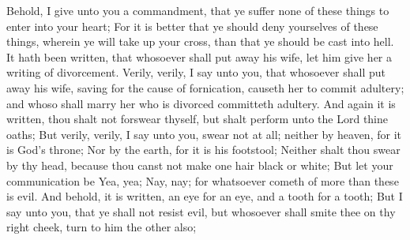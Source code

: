 Behold, I give unto you a commandment, that ye suffer none of these things to enter into your heart;
\bverse \iffalse For it is better that ye should deny yourselves of these things, wherein ye will take up your cross, than that ye should be cast into hell. \fi
For it is better that ye should deny yourselves of these things, wherein ye will take up your cross, than that ye should be cast into hell.
\bverse \iffalse It hath been written, that whosoever shall put away his wife, let him give her a writing of divorcement. \fi
It hath been written, that whosoever shall put away his wife, let him give her a writing of divorcement.
\bverse \iffalse Verily, verily, I say unto you, that whosoever shall put away his wife, saving for the cause of fornication, causeth her to commit adultery; and whoso shall marry her who is divorced committeth adultery. \fi
Verily, verily, I say unto you, that whosoever shall put away his wife, saving for the cause of fornication, causeth her to commit adultery; and whoso shall marry her who is divorced committeth adultery.
\bverse \iffalse And again it is written, thou shalt not forswear thyself, but shalt perform unto the Lord thine oaths; \fi
And again it is written, thou shalt not forswear thyself, but shalt perform unto the Lord thine oaths;
\bverse \iffalse But verily, verily, I say unto you, swear not at all; neither by heaven, for it is God's throne; \fi
But verily, verily, I say unto you, swear not at all; neither by heaven, for it is God's throne;
\bverse \iffalse Nor by the earth, for it is his footstool; \fi
Nor by the earth, for it is his footstool;
\bverse \iffalse Neither shalt thou swear by thy head, because thou canst not make one hair black or white; \fi
Neither shalt thou swear by thy head, because thou canst not make one hair black or white;
\bverse \iffalse But let your communication be Yea, yea; Nay, nay; for whatsoever cometh of more than these is evil. \fi
But let your communication be Yea, yea; Nay, nay; for whatsoever cometh of more than these is evil.
\bverse \iffalse And behold, it is written, an eye for an eye, and a tooth for a tooth; \fi
And behold, it is written, an eye for an eye, and a tooth for a tooth;
\bverse \iffalse But I say unto you, that ye shall not resist evil, but whosoever shall smite thee on thy right cheek, turn to him the other also; \fi
But I say unto you, that ye shall not resist evil, but whosoever shall smite thee on thy right cheek, turn to him the other also;

